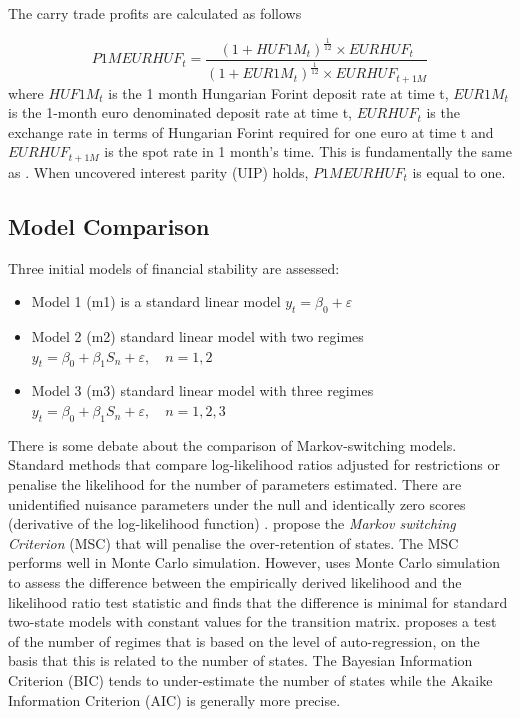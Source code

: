 \documentclass[12pt, a4paper, oneside]{article} %
\begin{document}
The carry trade profits are calculated as follows

\begin{equation}\label{eqref:carryprofit}
P1MEURHUF_t = \frac{(1 + HUF1M_t)^{\frac{1}{12}} \times EURHUF_t }{(1 + EUR1M_t)^{\frac{1}{12}} \times EURHUF_{t+1M}}
\end{equation}
where $HUF1M_t$ is the 1 month Hungarian Forint deposit rate at time t, $EUR1M_t$ is the 1-month euro denominated deposit rate at time t, $EURHUF_t$ is the exchange rate in terms of  Hungarian Forint required for one euro at time t and  $EURHUF_{t+1M}$ is the spot rate in 1 month's time.  This is fundamentally the same as \citep{BrunnermeierCarry}. When uncovered interest parity (UIP) holds, $P1MEURHUF_t$ is equal to one.  

\subsection{Model Comparison}
Three initial models of financial stability are assessed: 
\begin{itemize}
\item Model 1 (m1) is a standard linear model $y_t = \beta_0  + \varepsilon$
\item Model 2 (m2) standard linear model with two regimes $y_t = \beta_0 + \beta_1 S_n + \varepsilon, \quad n = 1, 2$
\item Model 3 (m3) standard linear model with three regimes $y_t = \beta_0 + \beta_1 S_n + \varepsilon, \quad n = 1, 2, 3$
\end{itemize}

There is some debate about the comparison of Markov-switching models.  Standard methods that compare log-likelihood ratios adjusted for restrictions or penalise the likelihood for the number of parameters estimated.  There are unidentified nuisance parameters under the null and identically zero scores (derivative of the log-likelihood function) \citet{hansen1992likelihood}.   \citet{Smith2006553} propose the \emph{Markov switching Criterion} (MSC) that will penalise the over-retention of states.  The MSC performs well in Monte Carlo simulation.  However, \citep{garcia1998asymptotic} uses Monte Carlo simulation to assess the difference between the empirically derived likelihood and the likelihood ratio test statistic and finds that the difference is minimal for standard two-state models with constant values for the transition matrix. \citet{citeulike:13372807} proposes a test of the number of regimes that is based on the level of auto-regression, on the basis that this is related to the number of states.  The Bayesian Information Criterion (BIC) tends to under-estimate the number of states while the Akaike Information Criterion (AIC) is generally more precise. 
\end{document}
